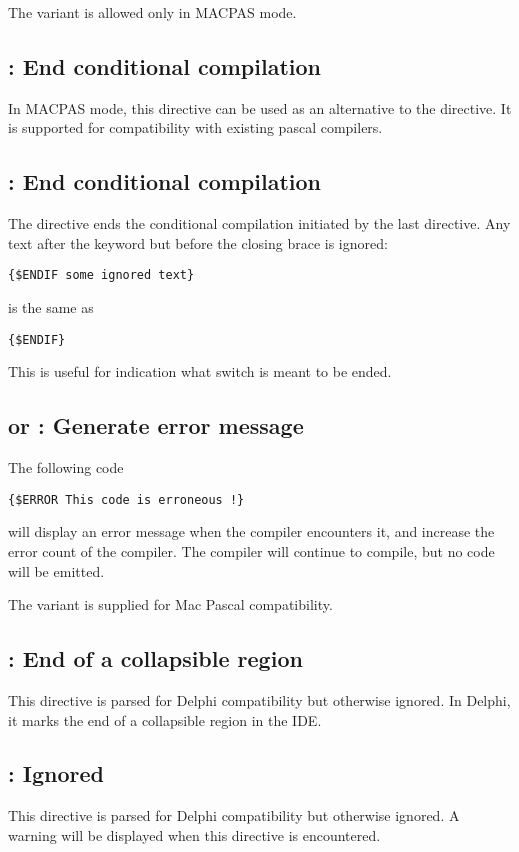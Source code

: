 The  variant is allowed only in MACPAS mode.

\subsection{ : End conditional compilation}
In MACPAS mode, this directive can be used as an alternative to the
 directive. It is supported for compatibility with existing \macos pascal
compilers.

\subsection{ : End conditional compilation}

The  directive ends the conditional compilation initiated by the
last  directive. Any text after the  keyword but
before the closing brace is ignored:
\begin{verbatim}
{$ENDIF some ignored text}
\end{verbatim}
is the same as
\begin{verbatim}
{$ENDIF}
\end{verbatim}
This is useful for indication what switch is meant to be ended.

\subsection{ or  : Generate error message}

The following code
\begin{verbatim}
{$ERROR This code is erroneous !}
\end{verbatim}
will display an error message when the compiler encounters it,
and increase the error count of the compiler.
The compiler will continue to compile, but no code will be emitted.

The  variant is supplied for Mac Pascal compatibility.

\subsection{: End of a collapsible region}
This directive is parsed for Delphi compatibility but otherwise ignored. 
In Delphi, it marks the end of a collapsible region in the IDE.

\subsection{: Ignored}
This directive is parsed for Delphi compatibility but otherwise ignored. A
warning will be displayed when this directive is encountered.

